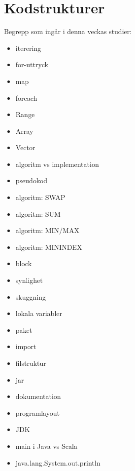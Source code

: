 \chapter{Kodstrukturer}\label{chapter:W02}
Begrepp som ingår i denna veckas studier:
\begin{itemize}[noitemsep,label={$\square$},leftmargin=*]
\item iterering
\item for-uttryck
\item map
\item foreach
\item Range
\item Array
\item Vector
\item algoritm vs implementation
\item pseudokod
\item algoritm: SWAP
\item algoritm: SUM
\item algoritm: MIN/MAX
\item algoritm: MININDEX
\item block
\item synlighet
\item skuggning
\item lokala variabler
\item paket
\item import
\item filstruktur
\item jar
\item dokumentation
\item programlayout
\item JDK
\item main i Java vs Scala
\item java.lang.System.out.println\end{itemize}
